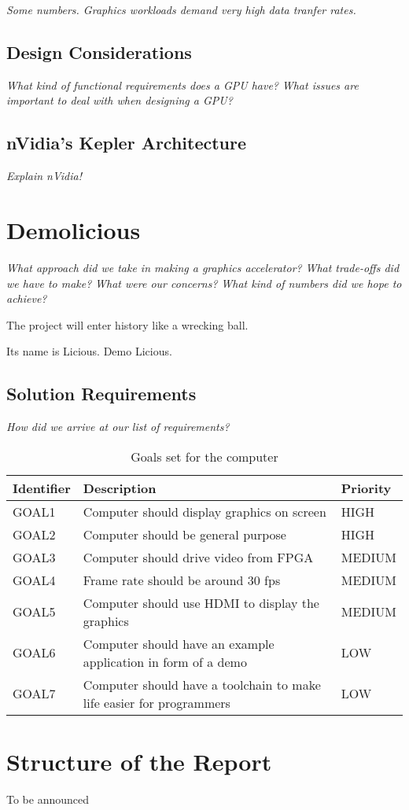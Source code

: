 \documentclass[../main/report.tex]{subfiles}
\begin{document}
\textit{Some numbers. Graphics workloads demand very high data tranfer rates.}

\subsection{Design Considerations}

\textit{What kind of functional requirements does a GPU have?}
\textit{What issues are important to deal with when designing a GPU?}

\subsection{nVidia's Kepler Architecture} %

\textit{Explain nVidia!}

\section{Demolicious}

\textit{What approach did we take in making a graphics accelerator?}
\textit{What trade-offs did we have to make?}
\textit{What were our concerns?}
\textit{What kind of numbers did we hope to achieve?}

The project will enter history like a wrecking ball.

Its name is Licious. Demo Licious.

\subsection{Solution Requirements}

\textit{How did we arrive at our list of requirements?}

\begin{table}[htp]
    \centering
    \begin{tabular}{|l|p{8cm}|l|}
        \hline
        \textbf{Identifier}           & \textbf{Description}                & \textbf{Priority} \\ \hline
        GOAL1  & Computer should display graphics on screen                           & HIGH    \\ \hline
        GOAL2  & Computer should be general purpose                                   & HIGH    \\ \hline
        GOAL3  & Computer should drive video from FPGA                                & MEDIUM  \\ \hline
        GOAL4  & Frame rate should be around 30 fps                                   & MEDIUM  \\ \hline
        GOAL5  & Computer should use HDMI to display the graphics                     & MEDIUM  \\ \hline
        GOAL6  & Computer should have an example application in form of a demo        & LOW     \\ \hline
        GOAL7  & Computer should have a toolchain to make life easier for programmers & LOW     \\ \hline
    \end{tabular}
    \caption{Goals set for the computer}
    \label{tab:goals}
\end{table}

\newpage
\section{Structure of the Report}

To be announced
\end{document}
